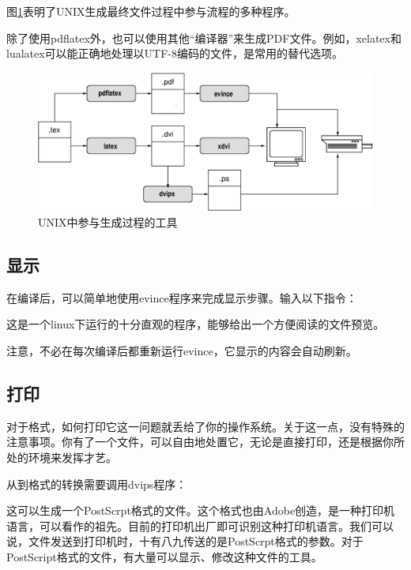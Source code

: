 图\ref{fig:1.2}表明了UNIX生成最终文件过程中参与流程的多种程序。

\begin{ii}
    除了使用pdflatex外，也可以使用其他“编译器”来生成PDF文件。例如，xelatex和lualatex可以能正确地处理以UTF-8编码的文件，是常用的替代选项。
\end{ii}

\begin{figure}[H]
    \centering
    \includegraphics[width = 0.8\linewidth]{img/cycle.eps}
    \caption{UNIX中参与生成过程的工具}
    \label{fig:1.2}
\end{figure}

\subsection{显示}%

在编译后，可以简单地使用\textsf{evince}程序来完成显示步骤。输入以下指令：


这是一个\textsf{linux}下运行的十分直观的程序，能够给出一个方便阅读的文件预览。

\begin{exclamation}
    注意，不必在每次编译后都重新运行evince，它显示的内容会自动刷新。
\end{exclamation}

\subsection{打印}

对于格式，如何打印它这一问题就丢给了你的操作系统。关于这一点，没有特殊的注意事项。你有了一个文件，可以自由地处置它，无论是直接打印，还是根据你所处的环境来发挥才艺。

\begin{ii}
    从到格式的转换需要调用dvips程序：


    这可以生成一个PostScrpt格式的文件。这个格式也由Adobe创造，是一种打印机语言，可以看作的祖先。目前的打印机出厂即可识别这种打印机语言。我们可以说，文件发送到打印机时，十有八九传送的是PostScrpt格式的参数。对于PostScript格式的文件，有大量可以显示、修改这种文件的工具。
\end{ii}

